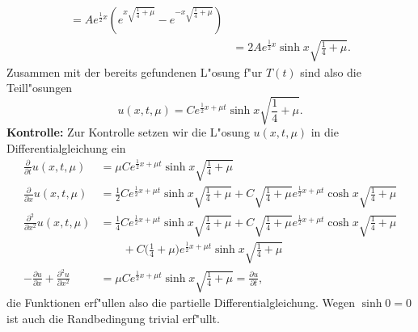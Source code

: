 {\begin{loesung}
\begin{teilaufgaben}
\begin{align*}
=Ae^{\frac12x}\left(
e^{x\sqrt{\frac14+\mu}}
-
e^{-x\sqrt{\frac14+\mu}}
\right)
\\
&=2Ae^{\frac12x}\sinh x\sqrt{\frac14+\mu}.
\end{align*}
Zusammen mit der bereits gefundenen L"osung f"ur $T(t)$ sind also
die Teill"osungen
\[
u(x,t,\mu)=
Ce^{\frac12x+\mu t}\sinh x\sqrt{\frac14+\mu}.
\]
{\bf Kontrolle:} Zur Kontrolle setzen wir die L"osung $u(x,t,\mu)$
in die Differentialgleichung ein
\begin{align*}
\frac{\partial}{\partial t}u(x,t,\mu)&=
\mu Ce^{\frac12x+\mu t}\sinh x\sqrt{\frac14+\mu}
\\
\frac{\partial}{\partial x}u(x,t,\mu)&=
\frac12
Ce^{\frac12x+\mu t}\sinh x\sqrt{\frac14+\mu}
+
C\sqrt{\frac14+\mu}e^{\frac12x+\mu t}\cosh x\sqrt{\frac14+\mu}
\\
\frac{\partial^2}{\partial x^2}u(x,t,\mu)&=
\frac14
Ce^{\frac12x+\mu t}\sinh x\sqrt{\frac14+\mu}
+
C\sqrt{\frac14+\mu}e^{\frac12x+\mu t}\cosh x\sqrt{\frac14+\mu}
\\
&\qquad +
C\biggl(\frac14+\mu\biggr)e^{\frac12x+\mu t}\sinh x\sqrt{\frac14+\mu}
\\
-\frac{\partial u}{\partial x}
+
\frac{\partial^2 u}{\partial x^2}
&=
\mu Ce^{\frac12x+\mu t}\sinh x\sqrt{\frac14+\mu}
=
\frac{\partial u}{\partial t},
\end{align*}
die Funktionen erf"ullen also die partielle Differentialgleichung.
Wegen $\sinh 0=0$ ist auch die Randbedingung trivial erf"ullt.
\end{teilaufgaben}
\end{loesung}
}{ }

